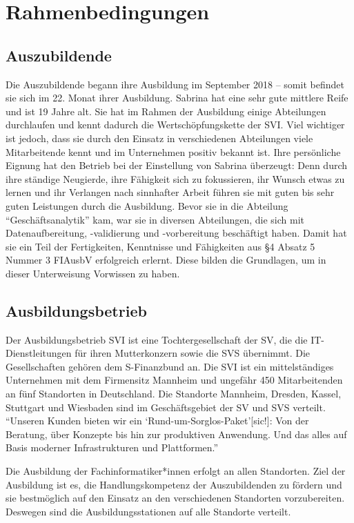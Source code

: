 \chapter{Rahmenbedingungen}

\section{Auszubildende}
Die Auszubildende \Azubi begann ihre Ausbildung im September 2018 -- somit befindet sie sich im 22. Monat ihrer Ausbildung. Sabrina hat eine sehr gute mittlere Reife und ist 19 Jahre alt. Sie hat im Rahmen der Ausbildung einige Abteilungen durchlaufen und kennt dadurch die Wertschöpfungskette der \ac{SVI}. Viel wichtiger ist jedoch, dass sie durch den Einsatz in verschiedenen Abteilungen viele Mitarbeitende kennt und im Unternehmen positiv bekannt ist. Ihre persönliche Eignung hat den Betrieb bei der Einstellung von Sabrina überzeugt: Denn durch ihre ständige Neugierde, ihre Fähigkeit sich zu fokussieren, ihr Wunsch etwas zu lernen und ihr Verlangen nach sinnhafter Arbeit führen sie mit guten bis sehr guten Leistungen durch die Ausbildung. Bevor sie in die Abteilung \enquote{Geschäftsanalytik} kam, war sie in diversen Abteilungen, die sich mit Datenaufbereitung, -validierung und -vorbereitung beschäftigt haben. Damit hat sie ein Teil der Fertigkeiten, Kenntnisse und Fähigkeiten aus §4 Absatz 5 Nummer 3 \ac{FIAusbV} erfolgreich erlernt. Diese bilden die Grundlagen, um in dieser Unterweisung Vorwissen zu haben. 

\section{Ausbildungsbetrieb}
Der Ausbildungsbetrieb \ac{SVI} ist eine Tochtergesellschaft der \ac{SV}, die die IT-Dienstleitungen für ihren Mutterkonzern sowie die \ac{SVS} übernimmt. Die Gesellschaften gehören dem S-Finanzbund an. Die \ac{SVI} ist ein mittelständiges Unternehmen mit dem Firmensitz Mannheim und ungefähr 450 Mitarbeitenden\autocite[vgl.][]{sv_informatik_gmbg_uber_2020} an fünf Standorten in Deutschland. Die Standorte Mannheim, Dresden, Kassel, Stuttgart und Wiesbaden sind im Geschäftsgebiet der \ac{SV} und \ac{SVS} verteilt. \enquote{Unseren Kunden bieten wir ein \enquote{Rund-um-Sorglos-Paket}[sic!]: Von der Beratung, über Konzepte bis hin zur produktiven Anwendung. Und das alles auf Basis moderner Infrastrukturen und Plattformen.}\autocite{sv_informatik_gmbg_uber_2020}
\par
Die Ausbildung der Fachinformatiker*innen erfolgt an allen Standorten. Ziel der Ausbildung ist es, die Handlungskompetenz der Auszubildenden zu fördern und sie bestmöglich auf den Einsatz an den verschiedenen Standorten vorzubereiten. Deswegen sind die Ausbildungsstationen auf alle Standorte verteilt.

